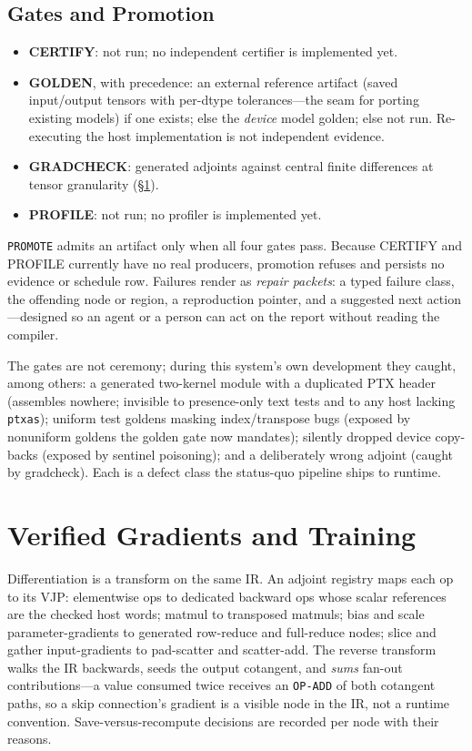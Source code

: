\documentclass[11pt]{article}
\newcommand{\code}[1]{\texttt{#1}}
\begin{document}
\subsection{Gates and Promotion}\label{sec:gates}
\begin{itemize}
\item \textbf{CERTIFY}: not run; no independent certifier is implemented yet.
\item \textbf{GOLDEN}, with precedence: an external reference artifact
  (saved input/output tensors with per-dtype tolerances---the seam for
  porting existing models) if one exists; else the \emph{device} model
  golden; else not run. Re-executing the host implementation is not
  independent evidence.
\item \textbf{GRADCHECK}: generated adjoints against central finite
  differences at tensor granularity (\S\ref{sec:train}).
\item \textbf{PROFILE}: not run; no profiler is implemented yet.
\end{itemize}
\code{PROMOTE} admits an artifact only when all four gates pass. Because
CERTIFY and PROFILE currently have no real producers, promotion refuses
and persists no evidence or schedule row.
Failures render as \emph{repair packets}: a typed failure class, the
offending node or region, a reproduction pointer, and a suggested next
action---designed so an agent or a person can act on the report without
reading the compiler.

The gates are not ceremony; during this system's own development they
caught, among others: a generated two-kernel module with a duplicated
PTX header (assembles nowhere; invisible to presence-only text tests and
to any host lacking \code{ptxas}); uniform test goldens masking
index/transpose bugs (exposed by nonuniform goldens the golden gate now
mandates); silently dropped device copy-backs (exposed by sentinel
poisoning); and a deliberately wrong adjoint (caught by gradcheck). Each
is a defect class the status-quo pipeline ships to runtime.

\section{Verified Gradients and Training}\label{sec:train}
Differentiation is a transform on the same IR. An adjoint registry maps
each op to its VJP: elementwise ops to dedicated backward ops whose
scalar references are the checked host words; matmul to transposed
matmuls; bias and scale parameter-gradients to generated row-reduce and
full-reduce nodes; slice and gather input-gradients to pad-scatter and
scatter-add. The reverse transform walks the IR backwards, seeds the
output cotangent, and \emph{sums} fan-out contributions---a value
consumed twice receives an \code{OP-ADD} of both cotangent paths, so a
skip connection's gradient is a visible node in the IR, not a runtime
convention. Save-versus-recompute decisions are recorded per node with
their reasons.
\end{document}
